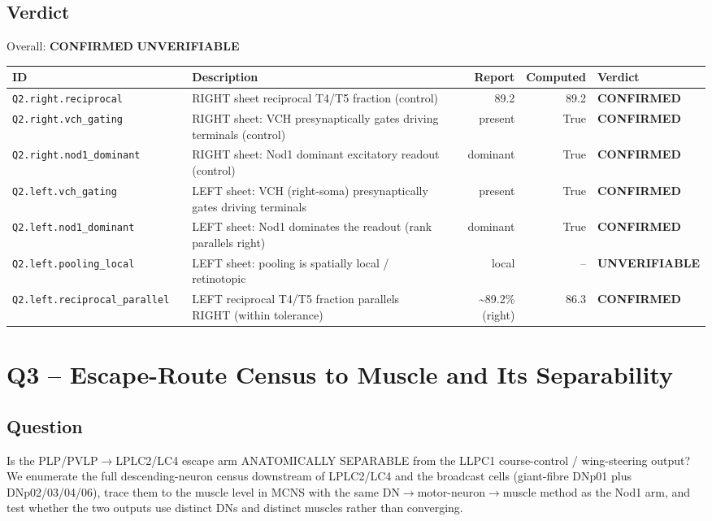 \documentclass[11pt]{article}
\begin{document}
\subsection*{Verdict}
\noindent Overall: \textcolor{vgreen}{\textbf{CONFIRMED}} \textcolor{vgray}{\textbf{UNVERIFIABLE}}\par\medskip
\begin{longtable}{@{}llp{}rrl@{}}
\toprule
\textbf{ID} & & \textbf{Description} & \textbf{Report} & \textbf{Computed} & \textbf{Verdict} \\
\midrule
\endhead
\texttt{Q2.right.reciprocal} & & RIGHT sheet reciprocal T4/T5 fraction (control) & 89.2 & 89.2 & \textcolor{vgreen}{\textbf{CONFIRMED}} \\
\texttt{Q2.right.vch\_gating} & & RIGHT sheet: VCH presynaptically gates driving terminals (control) & present & True & \textcolor{vgreen}{\textbf{CONFIRMED}} \\
\texttt{Q2.right.nod1\_dominant} & & RIGHT sheet: Nod1 dominant excitatory readout (control) & dominant & True & \textcolor{vgreen}{\textbf{CONFIRMED}} \\
\texttt{Q2.left.vch\_gating} & & LEFT sheet: VCH (right-soma) presynaptically gates driving terminals & present & True & \textcolor{vgreen}{\textbf{CONFIRMED}} \\
\texttt{Q2.left.nod1\_dominant} & & LEFT sheet: Nod1 dominates the readout (rank parallels right) & dominant & True & \textcolor{vgreen}{\textbf{CONFIRMED}} \\
\texttt{Q2.left.pooling\_local} & & LEFT sheet: pooling is spatially local / retinotopic & local & -- & \textcolor{vgray}{\textbf{UNVERIFIABLE}} \\
\texttt{Q2.left.reciprocal\_parallel} & & LEFT reciprocal T4/T5 fraction parallels RIGHT (within tolerance) & \textasciitilde{}89.2\% (right) & 86.3 & \textcolor{vgreen}{\textbf{CONFIRMED}} \\
\bottomrule
\end{longtable}

\section{Q3 -- Escape-Route Census to Muscle and Its Separability}

\subsection*{Question}
Is the PLP/PVLP$\rightarrow$LPLC2/LC4 escape arm ANATOMICALLY SEPARABLE from the LLPC1 course-control / wing-steering output? We enumerate the full descending-neuron census downstream of LPLC2/LC4 and the broadcast cells (giant-fibre DNp01 plus DNp02/03/04/06), trace them to the muscle level in MCNS with the same DN$\rightarrow$motor-neuron$\rightarrow$muscle method as the Nod1 arm, and test whether the two outputs use distinct DNs and distinct muscles rather than converging.
\end{document}

